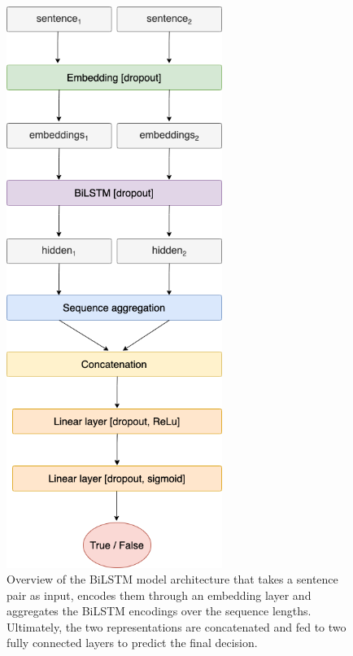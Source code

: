 \documentclass[11pt,a4paper]{article}
\begin{document}
\begin{figure}[H]
  \centering
  \includegraphics[width=7cm,keepaspectratio]{images/LSTM_architecture.png}
  \caption{Overview of the BiLSTM model architecture that takes a sentence pair as input, encodes them through an embedding layer and aggregates the BiLSTM encodings over the sequence lengths. Ultimately, the two representations are concatenated and fed to two fully connected layers to predict the final decision.}\label{fig:architecture}
\end{figure}
\end{document}

